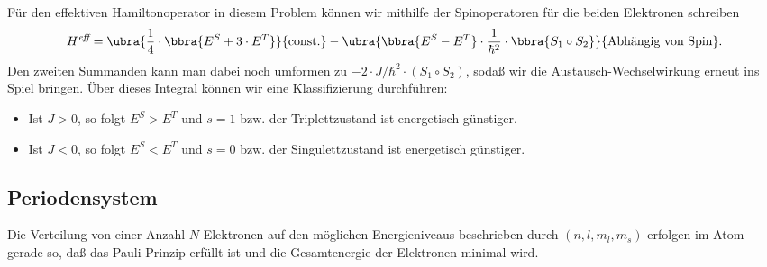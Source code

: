 \documentclass{subfiles}
\begin{document}

        Für den effektiven Hamiltonoperator in diesem Problem können wir mithilfe der Spinoperatoren für die beiden Elektronen schreiben
        \[
            H^\textit{eff} = \ubra{\frac{1}{4}\cdot\bbra{E^S + 3\cdot E^T}}{\text{const.}} - \ubra{\bbra{E^S - E^T}\cdot\frac{1}{\hbar^2}\cdot \bbra{S_1\circ S_2}}{\text{Abhängig von Spin}}.
        \]
        Den zweiten Summanden kann man dabei noch umformen zu $-2\cdot J/\hbar^2\cdot (S_1\circ S_2)$, sodaß wir die Austausch-Wechselwirkung erneut ins Spiel bringen. Über dieses Integral können wir eine Klassifizierung durchführen:
        \begin{itemize}[label=$\to$]
            \item Ist $J > 0$, so folgt $E^S>E^T$ und $s = 1$ bzw. der Triplettzustand ist energetisch günstiger.
            \item Ist $J < 0$, so folgt $E^S<E^T$ und $s = 0$ bzw. der Singulettzustand ist energetisch günstiger.
        \end{itemize}
        \begin{figure}
            \centering
        \end{figure}

    \subsection{Periodensystem} 
        Die Verteilung von einer Anzahl $N$ Elektronen auf den möglichen Energieniveaus beschrieben durch $(n,l,m_l,m_s)$ erfolgen im Atom gerade so, daß das Pauli-Prinzip erfüllt ist und die Gesamtenergie der Elektronen minimal wird. 
\end{document}
